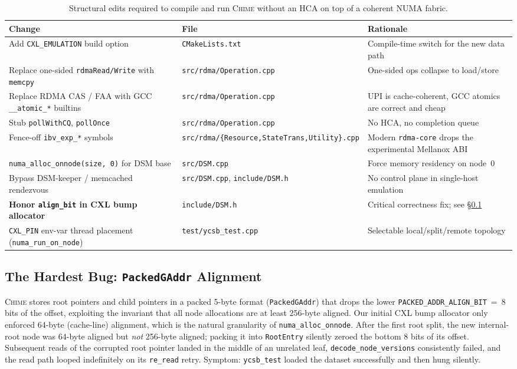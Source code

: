 \documentclass[11pt]{article}
\begin{document}
\begin{table}[h]
\centering
\small
\begin{tabular}{@{}p{}p{}p{}@{}}
\toprule
\textbf{Change} & \textbf{File} & \textbf{Rationale} \\ \midrule
Add \texttt{CXL\_EMULATION} build option & \texttt{CMakeLists.txt} & Compile-time switch for the new data path \\
Replace one-sided \texttt{rdmaRead/Write} with \texttt{memcpy} & \texttt{src/rdma/Operation.cpp} & One-sided ops collapse to load/store \\
Replace RDMA CAS / FAA with GCC \texttt{\_\_atomic\_*} builtins & \texttt{src/rdma/Operation.cpp} & UPI is cache-coherent, GCC atomics are correct and cheap \\
Stub \texttt{pollWithCQ}, \texttt{pollOnce} & \texttt{src/rdma/Operation.cpp} & No HCA, no completion queue \\
Fence-off \texttt{ibv\_exp\_*} symbols & \texttt{src/rdma/\{Resource,StateTrans,Utility\}.cpp} & Modern \texttt{rdma-core} drops the experimental Mellanox ABI \\
\texttt{numa\_alloc\_onnode(size,~0)} for DSM base & \texttt{src/DSM.cpp} & Force memory residency on node~0 \\
Bypass DSM-keeper / memcached rendezvous & \texttt{src/DSM.cpp}, \texttt{include/DSM.h} & No control plane in single-host emulation \\
\textbf{Honor \texttt{align\_bit} in CXL bump allocator} & \texttt{include/DSM.h} & Critical correctness fix; see \S\ref{sec:packed_bug} \\
\texttt{CXL\_PIN} env-var thread placement (\texttt{numa\_run\_on\_node}) & \texttt{test/ycsb\_test.cpp} & Selectable local/split/remote topology \\
\bottomrule
\end{tabular}
\caption{Structural edits required to compile and run \textsc{Chime} without an HCA on top of a coherent NUMA fabric.}
\label{tab:port_changes}
\end{table}

\subsection{The Hardest Bug: \texttt{PackedGAddr} Alignment}
\label{sec:packed_bug}
\textsc{Chime} stores root pointers and child pointers in a packed 5-byte format (\texttt{PackedGAddr}) that drops the lower \texttt{PACKED\_ADDR\_ALIGN\_BIT}~=~8 bits of the offset, exploiting the invariant that all node allocations are at least 256-byte aligned. Our initial CXL bump allocator only enforced 64-byte (cache-line) alignment, which is the natural granularity of \texttt{numa\_alloc\_onnode}. After the first root split, the new internal-root node was 64-byte aligned but \emph{not} 256-byte aligned; packing it into \texttt{RootEntry} silently zeroed the bottom 8 bits of its offset. Subsequent reads of the corrupted root pointer landed in the middle of an unrelated leaf, \texttt{decode\_node\_versions} consistently failed, and the read path looped indefinitely on its \texttt{re\_read} retry. Symptom: \texttt{ycsb\_test} loaded the dataset successfully and then hung silently.
\end{document}
